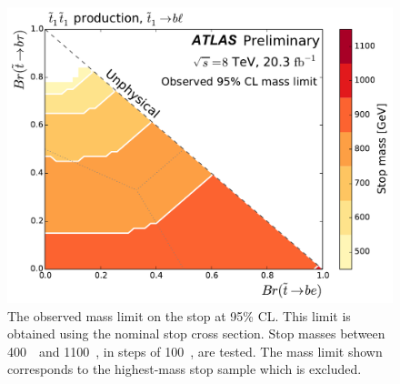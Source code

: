 \begin{figure}[p]
  \centering
  \includegraphics[width=\textwidth]
    {figs/blstop/mass_limit_contours_no_extras_obs.pdf}
  \caption{The observed mass limit on the stop at 95\% CL.
    This limit is obtained using the nominal stop cross section.
    Stop masses between 400~\GeV\ and 1100~\GeV, in steps of 100~\GeV, are
    tested.
    The mass limit shown corresponds to the highest-mass stop sample which is
    excluded.
  }
  \label{fig:mass_limit_obs}
\end{figure}


